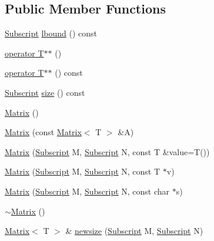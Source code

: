 \subsection*{Public Member Functions}
\begin{DoxyCompactItemize}
\item 
\hyperlink{namespaceTNT_af22e3f1460e145c04ce4e7d701e4c1c1}{Subscript} \hyperlink{classTNT_1_1Matrix_afb5b350bb3b5fa9980543908fb693235}{lbound} () const
\item 
\hyperlink{classTNT_1_1Matrix_a8d5e0a7494b3e4a1a1474eebbe39001c}{operator T$\ast$$\ast$} ()
\item 
\hyperlink{classTNT_1_1Matrix_a13deaf0c2cbe7d1d6cc045d67890b154}{operator T$\ast$$\ast$} () const
\item 
\hyperlink{namespaceTNT_af22e3f1460e145c04ce4e7d701e4c1c1}{Subscript} \hyperlink{classTNT_1_1Matrix_a3dfd456614090dc8057721961e4972bc}{size} () const
\item 
\hyperlink{classTNT_1_1Matrix_a38e705abbbd5155756241db959bae662}{Matrix} ()
\item 
\hyperlink{classTNT_1_1Matrix_aa6cd1bfe3ede4545d0e6693a443b50f1}{Matrix} (const \hyperlink{classTNT_1_1Matrix}{Matrix}$<$ T $>$ \&A)
\item 
\hyperlink{classTNT_1_1Matrix_ae79fec5ae7648b9971523bcc123af764}{Matrix} (\hyperlink{namespaceTNT_af22e3f1460e145c04ce4e7d701e4c1c1}{Subscript} M, \hyperlink{namespaceTNT_af22e3f1460e145c04ce4e7d701e4c1c1}{Subscript} N, const T \&value=T())
\item 
\hyperlink{classTNT_1_1Matrix_ac66034c440243c8ff299c0c0774ad82d}{Matrix} (\hyperlink{namespaceTNT_af22e3f1460e145c04ce4e7d701e4c1c1}{Subscript} M, \hyperlink{namespaceTNT_af22e3f1460e145c04ce4e7d701e4c1c1}{Subscript} N, const T $\ast$v)
\item 
\hyperlink{classTNT_1_1Matrix_a4f19bfddcd8e952d7709d3d4b969bd44}{Matrix} (\hyperlink{namespaceTNT_af22e3f1460e145c04ce4e7d701e4c1c1}{Subscript} M, \hyperlink{namespaceTNT_af22e3f1460e145c04ce4e7d701e4c1c1}{Subscript} N, const char $\ast$s)
\item 
\hyperlink{classTNT_1_1Matrix_ac3cd6db0fe4b5aecd460c99b8a456aae}{$\sim$\+Matrix} ()
\item 
\hyperlink{classTNT_1_1Matrix}{Matrix}$<$ T $>$ \& \hyperlink{classTNT_1_1Matrix_a2fa0b7e3924a7a51d2973b93b698aa05}{newsize} (\hyperlink{namespaceTNT_af22e3f1460e145c04ce4e7d701e4c1c1}{Subscript} M, \hyperlink{namespaceTNT_af22e3f1460e145c04ce4e7d701e4c1c1}{Subscript} N)
\item 

\end{DoxyCompactItemize}
